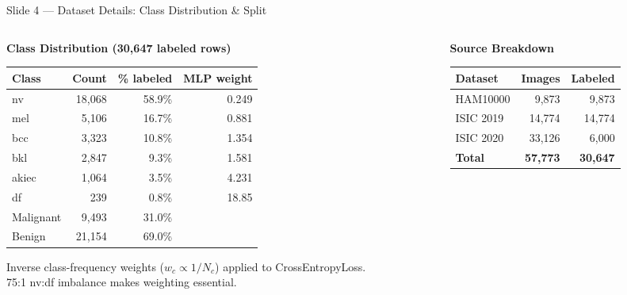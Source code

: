 \documentclass[aspectratio=169, 9pt]{beamer}
\begin{document}
\begin{frame}{Slide 4 --- Dataset Details: Class Distribution \& Split}

  \begin{columns}[T]

    \begin{column}{0.54\textwidth}
      \textbf{\color{navyblue}Class Distribution (30,647 labeled rows)}

      \vspace{0.3em}
      {\small
      \begin{tabular}{@{} l r r r @{}}
        \toprule
        Class & Count & \% labeled & MLP weight \\
        \midrule
        {\color{teal}nv}    & 18,068 & 58.9\% & 0.249 \\
        {\color{orange}mel} &  5,106 & 16.7\% & 0.881 \\
        {\color{orange}bcc} &  3,323 & 10.8\% & 1.354 \\
        {\color{teal}bkl}   &  2,847 &  9.3\% & 1.581 \\
        {\color{orange}akiec} & 1,064 & 3.5\% & 4.231 \\
        {\color{teal}df}    &    239 &  0.8\% & 18.85 \\
        \midrule
        {\color{darkred}Malignant} & 9,493 & 31.0\% & \\
        {\color{darkgreen}Benign}  & 21,154 & 69.0\% & \\
        \bottomrule
      \end{tabular}
      }

      \vspace{0.4em}
      {\scriptsize\color{gray}
      Inverse class-frequency weights ($w_c \propto 1/N_c$) applied to CrossEntropyLoss.\\
      75:1 nv:df imbalance makes weighting essential.}
    \end{column}

    \begin{column}{0.42\textwidth}
      \textbf{\color{navyblue}Source Breakdown}

      \vspace{0.3em}
      {\small
      \begin{tabular}{@{} l r r @{}}
        \toprule
        Dataset & Images & Labeled \\
        \midrule
        HAM10000  &  9,873 &  9,873 \\
        ISIC 2019 & 14,774 & 14,774 \\
        ISIC 2020 & 33,126 &  6,000 \\
        \midrule
        \textbf{Total} & \textbf{57,773} & \textbf{30,647} \\
        \bottomrule
      \end{tabular}
      }


\end{column}
\end{columns}
\end{frame}
\end{document}
